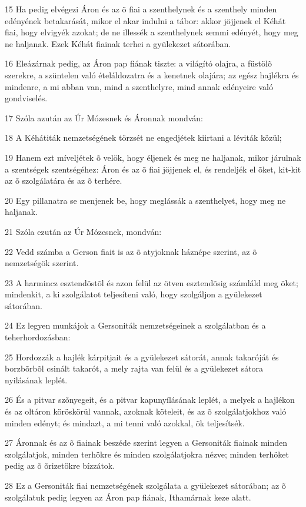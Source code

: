 \par 15 Ha pedig elvégezi Áron és az õ fiai a szenthelynek és a szenthely minden edényének betakarását, mikor el akar indulni a tábor: akkor jöjjenek el Kéhát fiai, hogy elvigyék azokat; de ne illessék a szenthelynek semmi edényét, hogy meg ne haljanak. Ezek Kéhát fiainak terhei a gyülekezet sátorában.
\par 16 Eleázárnak pedig, az Áron pap fiának tiszte: a világító olajra, a füstölõ szerekre, a szüntelen való ételáldozatra és a kenetnek olajára; az egész hajlékra és mindenre, a mi abban van, mind a szenthelyre, mind annak edényeire való gondviselés.
\par 17 Szóla azután az Úr Mózesnek és Áronnak mondván:
\par 18 A Kéhátiták nemzetségének törzsét ne engedjétek kiirtani a léviták közül;
\par 19 Hanem ezt míveljétek õ velök, hogy éljenek és meg ne haljanak, mikor járulnak a szentségek szentségéhez: Áron és az õ fiai jöjjenek el, és rendeljék el õket, kit-kit az õ szolgálatára és az õ terhére.
\par 20 Egy pillanatra se menjenek be, hogy meglássák a szenthelyet, hogy meg ne haljanak.
\par 21 Szóla ezután az Úr Mózesnek, mondván:
\par 22 Vedd számba a Gerson fiait is az õ atyjoknak háznépe szerint, az õ nemzetségök szerint.
\par 23 A harmincz esztendõstõl és azon felül az ötven esztendõsig számláld meg õket; mindenkit, a ki szolgálatot teljesíteni való, hogy szolgáljon a gyülekezet sátorában.
\par 24 Ez legyen munkájok a Gersoniták nemzetségeinek a szolgálatban és a teherhordozásban:
\par 25 Hordozzák a hajlék kárpitjait és a gyülekezet sátorát, annak takaróját és borzbõrbõl csinált takarót, a mely rajta van felül és a gyülekezet sátora nyilásának leplét.
\par 26 És a pitvar szõnyegeit, és a pitvar kapunyílásának leplét, a melyek a hajlékon és az oltáron köröskörül vannak, azoknak köteleit, és az õ szolgálatjokhoz való minden edényt; és mindazt, a mi tenni való azokkal, õk teljesítsék.
\par 27 Áronnak és az õ fiainak beszéde szerint legyen a Gersoniták fiainak minden szolgálatjok, minden terhökre és minden szolgálatjokra nézve; minden terhöket pedig az õ õrizetökre bízzátok.
\par 28 Ez a Gersoniták fiai nemzetségének szolgálata a gyülekezet sátorában; az õ szolgálatuk pedig legyen az Áron pap fiának, Ithamárnak keze alatt.
